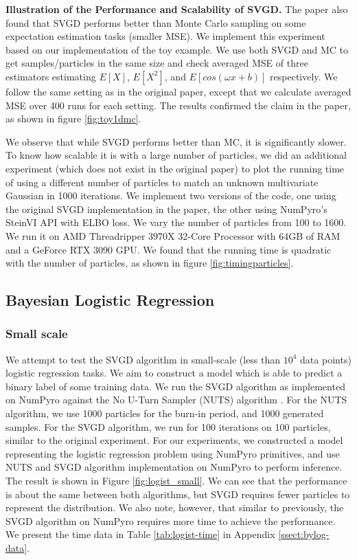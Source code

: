 \noindent\textbf{Illustration of the Performance and Scalability of SVGD.} The paper also found that SVGD performs better than Monte Carlo sampling on some expectation estimation tasks (smaller MSE). We implement this experiment based on our implementation of the toy example. We use both SVGD and MC to get samples/particles in the same size and check averaged MSE of three estimators estimating $E[X]$, $E[X^2]$, and $E[cos(\omega x + b)]$ respectively. We follow the same setting as in the original paper, except that we calculate averaged MSE over 400 runs for each setting. The results confirmed the claim in the paper, as shown in figure \ref{fig:toy1dmc}.



We observe that while SVGD performs better than MC, it is significantly slower. To know how scalable it is with a large number of particles, we did an additional experiment (which does not exist in the original paper) to plot the running time of using a different number of particles to match an unknown multivariate Gaussian in 1000 iterations. We implement two versions of the code, one using the original SVGD implementation in the paper, the other using NumPyro's SteinVI API with ELBO loss. We vary the number of particles from 100 to 1600. We run it on AMD Threadripper 3970X 32-Core Processor with 64GB of RAM and a GeForce RTX 3090 GPU. We found that the 
running time is quadratic with the number of particles, as shown in figure \ref{fig:timingparticles}.



\subsection{Bayesian Logistic Regression}
\subsubsection{Small scale}
We attempt to test the SVGD algorithm in small-scale (less than $10^4$ data points) logistic regression tasks. We aim to construct a model which is able to predict a binary label of some training data. We run the SVGD algorithm as implemented on NumPyro against the No U-Turn Sampler (NUTS) algorithm \cite{nuts}. For the NUTS algorithm, we use 1000 particles for the burn-in period, and 1000 generated samples. For the SVGD algorithm, we run for 100 iterations on 100 particles, similar to the original experiment. For our experiments, we constructed a model representing the logistic regression problem using NumPyro primitives, and use NUTS and SVGD algorithm implementation on NumPyro to perform inference. The result is shown in Figure \ref{fig:logist_small}. We can see that the performance is about the same between both algorithms, but SVGD requires fewer particles to represent the distribution. We also note, however, that similar to previously, the SVGD algorithm on NumPyro requires more time to achieve the performance. We present the time data in Table \ref{tab:logist-time} in Appendix \ref{ssect:bylog-data}.

